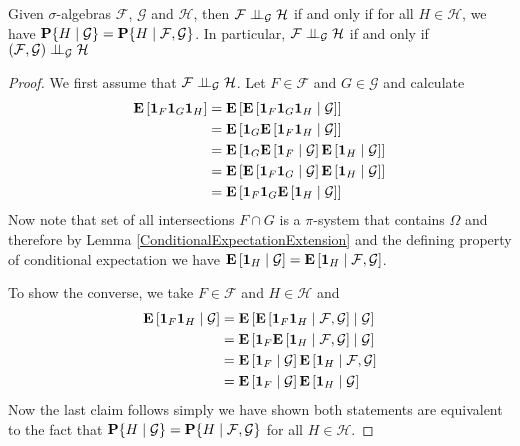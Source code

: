 \begin{lem}\label{ConditionalIndependenceDoob}Given $\sigma$-algebras $\mathcal{F}$, $\mathcal{G}$ and
  $\mathcal{H}$, then
  $\cindependent{\mathcal{F}}{\mathcal{H}}{\mathcal{G}}$ if and only
  if for all $H \in \mathcal{H}$, we have
  $\cprobability{\mathcal{G}}{H} =
  \cprobability{\mathcal{F},\mathcal{G}}{H}$.
In particular, $\cindependent{\mathcal{F}}{\mathcal{H}}{\mathcal{G}}$
if and only if $\cindependent{\left (\mathcal{F}, \mathcal{G} \right )}{\mathcal{H}}{\mathcal{G}}$
\end{lem}
\begin{proof}
We first assume that
$\cindependent{\mathcal{F}}{\mathcal{H}}{\mathcal{G}}$.  Let $F \in
\mathcal{F}$ and $G \in \mathcal{G}$ and calculate
\begin{align*}
\expectation{\characteristic{F}\characteristic{G}\characteristic{H}}
&=
\expectation{\cexpectationlong{\mathcal{G}}{\characteristic{F}\characteristic{G}\characteristic{H}}}
\\
&=
\expectation{\characteristic{G}\cexpectationlong{\mathcal{G}}{\characteristic{F}\characteristic{H}}} \\
&=
\expectation{\characteristic{G}\cexpectationlong{\mathcal{G}}{\characteristic{F}}\cexpectationlong{\mathcal{G}}{\characteristic{H}}} \\
&=
\expectation{\cexpectationlong{\mathcal{G}}{\characteristic{F}\characteristic{G}}\cexpectationlong{\mathcal{G}}{\characteristic{H}}} \\
&=
\expectation{\characteristic{F}\characteristic{G}\cexpectationlong{\mathcal{G}}{\characteristic{H}}} \\
\end{align*}
Now note that set of all intersections $F \cap G$ is a $\pi$-system
that contains $\Omega$ and therefore by Lemma
\ref{ConditionalExpectationExtension} and the defining property of
conditional expectation we have
$\cexpectationlong{\mathcal{G}}{\characteristic{H}} =
\cexpectationlong{\mathcal{F},\mathcal{G}}{\characteristic{H}}$.

To show the converse, we take $F \in \mathcal{F}$ and $H \in
\mathcal{H}$ and
\begin{align*}
\cexpectationlong{\mathcal{G}}{\characteristic{F}\characteristic{H}} &=
\cexpectationlong{\mathcal{G}}{\cexpectationlong{\mathcal{F},
    \mathcal{G}}{\characteristic{F}\characteristic{H}}} \\
&= \cexpectationlong{\mathcal{G}}{\characteristic{F}\cexpectationlong{\mathcal{F},
    \mathcal{G}}{\characteristic{H}}} \\
&= \cexpectationlong{\mathcal{G}}{\characteristic{F}} \cexpectationlong{\mathcal{F},
    \mathcal{G}}{\characteristic{H}}\\
&= \cexpectationlong{\mathcal{G}}{\characteristic{F}} \cexpectationlong{\mathcal{G}}{\characteristic{H}}\\
\end{align*}
Now the last claim follows simply we have shown both
statements are equivalent to the fact that
$\cprobability{\mathcal{G}}{H} =
\cprobability{\mathcal{F},\mathcal{G}}{H}$ for all $H \in \mathcal{H}$.
\end{proof}

